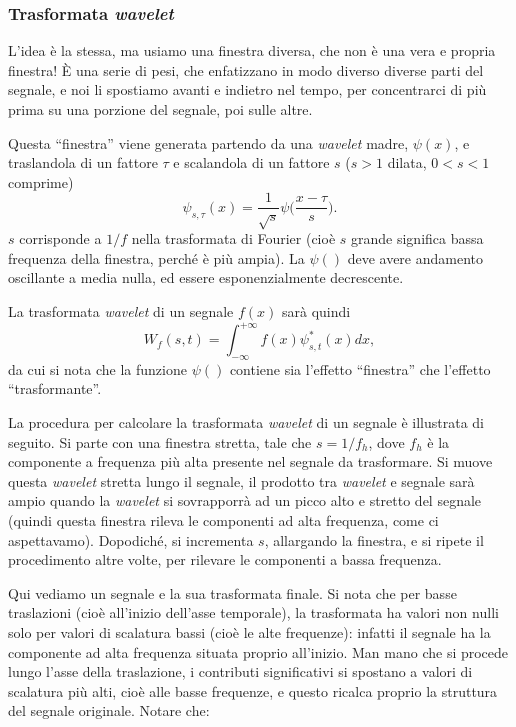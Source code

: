 \documentclass[a4paper,11pt]{article}
\begin{document}
\subsubsection{Trasformata \textit{wavelet}}
L'idea è la stessa, ma usiamo una finestra diversa, che non è una vera e propria finestra! È una serie di pesi, che enfatizzano in modo diverso diverse parti del segnale, e noi li spostiamo
avanti e indietro nel tempo, per concentrarci di più prima su una porzione del segnale, poi sulle altre.
\par
Questa ``finestra'' viene generata partendo da una \textit{wavelet} madre, $\psi(x)$, e traslandola di un fattore $\tau$ e scalandola di un fattore $s$ ($s>1$ dilata, $0<s<1$ comprime)
\[
\psi_{s,\tau}(x) = \frac{1}{\sqrt{s}} \psi\Big(\frac{x-\tau}{s}\Big).
\]
$s$ corrisponde a $1/f$ nella trasformata di Fourier (cioè $s$ grande significa bassa frequenza della finestra, perché è più ampia). La $\psi()$ deve avere andamento oscillante a media nulla,
ed essere esponenzialmente decrescente.
\par
La trasformata \textit{wavelet} di un segnale $f(x)$ sarà quindi
\[
W_f(s,t) = \int_{-\infty}^{+\infty} f(x) \psi^*_{s,t}(x) dx,
\]
da cui si nota che la funzione $\psi()$ contiene sia l'effetto ``finestra'' che l'effetto ``trasformante''.
\par
La procedura per calcolare la trasformata \textit{wavelet} di un segnale è illustrata di seguito.
Si parte con una finestra stretta, tale che $s = 1/f_h$, dove $f_h$ è la componente a frequenza più alta presente nel segnale da trasformare. Si muove questa \textit{wavelet} stretta
lungo il segnale, il prodotto tra \textit{wavelet} e segnale sarà ampio quando la \textit{wavelet} si sovrapporrà ad un picco alto e stretto del segnale (quindi questa finestra rileva
le componenti ad alta frequenza, come ci aspettavamo).
Dopodiché, si incrementa $s$, allargando la finestra, e si ripete il procedimento altre volte, per rilevare le componenti a bassa frequenza.
\par
Qui vediamo un segnale e la sua trasformata finale. Si nota che per basse traslazioni (cioè all'inizio dell'asse temporale), la trasformata ha valori non nulli solo per valori di scalatura bassi
(cioè le alte frequenze): infatti il segnale ha la componente ad alta frequenza situata proprio all'inizio. Man mano che si procede lungo l'asse della traslazione, i contributi significativi
si spostano a valori di scalatura più alti, cioè alle basse frequenze, e questo ricalca proprio la struttura del segnale originale.
Notare che:
\end{document}
